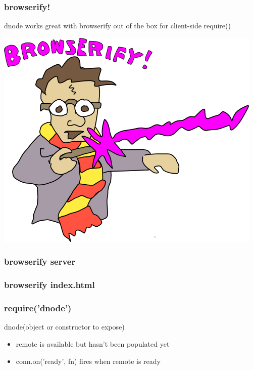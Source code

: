 \documentclass{beamer}
\begin{document}
\begin{frame}
    \frametitle{browserify!}
    
    \huge
    dnode works great with browserify out of the box
    for client-side require()
    \newline
    
    \begin{center}
        \includegraphics[scale=0.35]{images/browserify.png}
    \end{center}
\end{frame}

\begin{frame}
    \frametitle{browserify server}
    
    \begin{center}
        \scriptsize
        \fbox{}
    \end{center}
\end{frame}

\begin{frame}
    \frametitle{browserify index.html}
    
    \begin{center}
        \scriptsize
        \fbox{}
    \end{center}
\end{frame}

\begin{frame}
    \frametitle{require('dnode')}
    \large
    dnode(object or constructor to expose)
    \newline
    
    \normalsize
    \fbox{}
    \newline
    
    \begin{itemize}
    \pause
    \item remote is available but hasn't been populated yet
    
    \pause
    \item conn.on('ready', fn) fires when remote is ready
    \end{itemize}
\end{frame}
\end{document}

